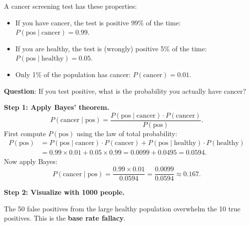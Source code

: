 \begin{example}
    A cancer screening test has these properties:
    \begin{itemize}
        \item If you have cancer, the test is positive 99\% of the time: $P(\text{pos} \mid \text{cancer}) = 0.99$.
        \item If you are healthy, the test is (wrongly) positive 5\% of the time: $P(\text{pos} \mid \text{healthy}) = 0.05$.
        \item Only 1\% of the population has cancer: $P(\text{cancer}) = 0.01$.
    \end{itemize}

    \textbf{Question}: If you test positive, what is the probability you actually have cancer?

    \textbf{Step 1: Apply Bayes' theorem.}
    \[
        P(\text{cancer} \mid \text{pos}) = \frac{P(\text{pos} \mid \text{cancer}) \cdot P(\text{cancer})}{P(\text{pos})}.
    \]
    First compute $P(\text{pos})$ using the law of total probability:
    \begin{align*}
        P(\text{pos}) & = P(\text{pos} \mid \text{cancer}) \cdot P(\text{cancer}) + P(\text{pos} \mid \text{healthy}) \cdot P(\text{healthy}) \\
                      & = 0.99 \times 0.01 + 0.05 \times 0.99 = 0.0099 + 0.0495 = 0.0594.
    \end{align*}
    Now apply Bayes:
    \[
        P(\text{cancer} \mid \text{pos}) = \frac{0.99 \times 0.01}{0.0594} = \frac{0.0099}{0.0594} \approx 0.167.
    \]

    \textbf{Step 2: Visualize with 1000 people.}
    \begin{center}
    \end{center}
    The 50 false positives from the large healthy population overwhelm the 10 true positives. This is the \textbf{base rate fallacy}.


\end{example}
